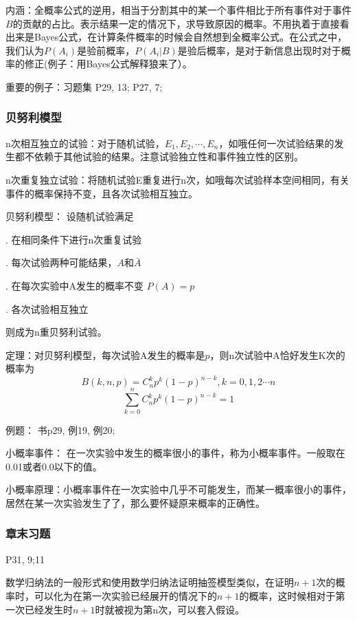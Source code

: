 \documentclass[10pt, a4paper]{article}
\begin{document}
            内涵：全概率公式的逆用，相当于分割其中的某一个事件相比于所有事件对于事件$B$的贡献的占比。表示结果一定的情况下，求导致原因的概率。不用执着于直接看出来是Bayes公式，在计算条件概率的时候会自然想到全概率公式。在公式之中，我们认为$P(A_i)$是验前概率，$P(A_i|B)$是验后概率，是对于新信息出现时对于概率的修正(例子：用Bayes公式解释狼来了）。

            重要的例子：习题集 P29, 13; P27, 7;
        \subsubsection{贝努利模型}
            n次相互独立的试验：对于随机试验，$E_1, E_2, \cdots, E_n$，如哦任何一次试验结果的发生都不依赖于其他试验的结果。注意试验独立性和事件独立性的区别。

            n次重复独立试验：将随机试验E重复进行n次，如哦每次试验样本空间相同，有关事件的概率保持不变，且各次试验相互独立。

            贝努利模型： 设随机试验满足

                . 在相同条件下进行n次重复试验

                . 每次试验两种可能结果，$A$和$\bar{A}$

                . 在每次实验中A发生的概率不变 $P(A) = p$

                . 各次试验相互独立
            
                则成为n重贝努利试验。

            定理：对贝努利模型，每次试验A发生的概率是$p$，则n次试验中A恰好发生K次的概率为
            $$B(k, n, p) = C_n^kp^k(1 - p)^{n - k}, k = 0, 1, 2 \cdots n$$
            $$\sum_{k = 0}^{n}C_n^kp^k(1 - p)^{n - k} = 1$$
            
            例题： 书p29, 例19, 例20;

            小概率事件： 在一次实验中发生的概率很小的事件，称为小概率事件。一般取在0.01或者0.0以下的值。 

            小概率原理：小概率事件在一次实验中几乎不可能发生，而某一概率很小的事件，居然在某一次实验发生了了，那么要怀疑原来概率的正确性。
        \subsubsection{章末习题}
            P31, 9;11 

            数学归纳法的一般形式和使用数学归纳法证明抽签模型类似，在证明$n+1$次的概率时，可以化为在第一次实验已经展开的情况下的$n+1$的概率，这时候相对于第一次已经发生时$n+1$时就被视为第n次，可以套入假设。 
\end{document}
